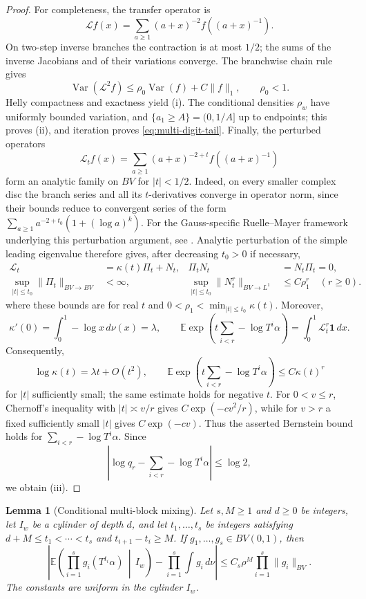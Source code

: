 \documentclass[11pt,a4paper]{amsart}
\newtheorem{lemma}[theorem]{Lemma}
\theoremstyle{definition}
\theoremstyle{remark}
\newcommand{\E}{\mathbb E}
\newcommand{\ind}{\mathbf 1}
\newcommand{\Var}{\operatorname{Var}}
\begin{document}
\begin{proof}
For completeness, the transfer operator is
\[
 \mathcal Lf(x)=\sum_{a\ge1}(a+x)^{-2}
 f\!\left((a+x)^{-1}\right).
\]
On two-step inverse branches the contraction is at most $1/2$; the sums of
the inverse Jacobians and of their variations converge.  The branchwise chain
rule gives
\[
 \Var(\mathcal L^2f)\le\rho_0\Var(f)+C\|f\|_1,
 \qquad \rho_0<1.
\]
Helly compactness and exactness yield (i).  The conditional densities
$\rho_w$ have uniformly bounded variation, and
$\{a_1\ge A\}=(0,1/A]$ up to endpoints; this proves (ii), and iteration proves
\eqref{eq:multi-digit-tail}.  Finally, the perturbed operators
\[
 \mathcal L_t f(x)=\sum_{a\ge1}(a+x)^{-2+t}
 f\!\left((a+x)^{-1}\right)
\]
form an analytic family on $BV$ for $|t|<1/2$.  Indeed, on every smaller
complex disc the branch series and all its $t$-derivatives converge in
operator norm, since their bounds reduce to convergent series of the form
$\sum_{a\ge1}a^{-2+t_0}(1+(\log a)^k)$.  For the Gauss-specific
Ruelle--Mayer framework underlying this perturbation argument, see
\cite{Vallee97}.  Analytic perturbation of the simple leading eigenvalue
\cite[Chap.~VII]{Kato95} therefore gives, after decreasing $t_0>0$ if necessary,
\[
 \begin{aligned}
  \mathcal L_t&=\kappa(t)\Pi_t+N_t,
  &\Pi_tN_t&=N_t\Pi_t=0,\\
  \sup_{|t|\le t_0}\|\Pi_t\|_{BV\to BV}&<\infty,
  &\sup_{|t|\le t_0}\|N_t^r\|_{BV\to L^1}&\le C\rho_1^r
  \quad(r\ge0).
 \end{aligned}
\]
where these bounds are for real $t$ and
$0<\rho_1<\min_{|t|\le t_0}\kappa(t)$.  Moreover,
\[
 \kappa'(0)=\int_0^1-\log x\,d\nu(x)=\lambda,
 \qquad
 \E\exp\!\left(t\sum_{i<r}-\log T^i\alpha\right)
 =\int_0^1\mathcal L_t^r\ind\,dx.
\]
Consequently,
\[
 \log\kappa(t)=\lambda t+O(t^2),
 \qquad
 \E\exp\!\left(t\sum_{i<r}-\log T^i\alpha\right)
 \le C\kappa(t)^r
\]
for $|t|$ sufficiently small; the same estimate holds for negative $t$.
For $0<v\le r$, Chernoff's inequality with $|t|\asymp v/r$ gives
$C\exp(-cv^2/r)$, while for $v>r$ a fixed sufficiently small $|t|$ gives
$C\exp(-cv)$.  Thus the asserted Bernstein bound holds for
$\sum_{i<r}-\log T^i\alpha$.
Since
\[
 \left|\log q_r-\sum_{i<r}-\log T^i\alpha\right|\le\log2,
\]
we obtain (iii).
\end{proof}

\begin{lemma}[Conditional multi-block mixing]\label{lem:conditional-mixing}
Let $s,M\ge1$ and $d\ge0$ be integers, let $I_w$ be a cylinder of depth $d$,
and let $t_1,\ldots,t_s$ be integers satisfying
$d+M\le t_1<\cdots<t_s$ and $t_{i+1}-t_i\ge M$.  If
$g_1,\ldots,g_s\in BV(0,1)$, then
\begin{equation}\label{eq:conditional-mixing}
 \left|
 \E\left(\prod_{i=1}^s g_i(T^{t_i}\alpha)\,\middle|\,I_w\right)
 -\prod_{i=1}^s\int g_i\,d\nu
 \right|
 \le C_s\rho^M\prod_{i=1}^s\|g_i\|_{BV}.
\end{equation}
The constants are uniform in the cylinder $I_w$.
\end{lemma}
\end{document}
